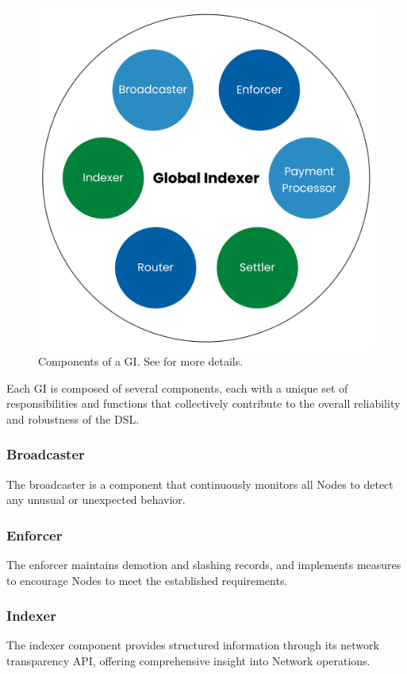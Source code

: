 {
    \begin{figure}[tb!]
        \centering
        \includegraphics[width=0.8\columnwidth]{figures/GI-components.png}
        \caption{Components of a \gls{GI}. See  for more details.}
        \label{fig:GI-components}
    \end{figure}
}

Each \gls{GI} is composed of several components, each with a unique set of responsibilities and functions that collectively contribute to the overall reliability and robustness of the \gls{DSL}.

\subsubsection{Broadcaster}
The broadcaster is a component that continuously monitors all \glspl{Node} to detect any unusual or unexpected behavior.

\subsubsection{Enforcer}
The enforcer maintains demotion and slashing records, and implements measures to encourage \glspl{Node} to meet the established requirements.

\subsubsection{Indexer}
The indexer component provides structured information through its network transparency API, offering comprehensive insight into Network operations.

